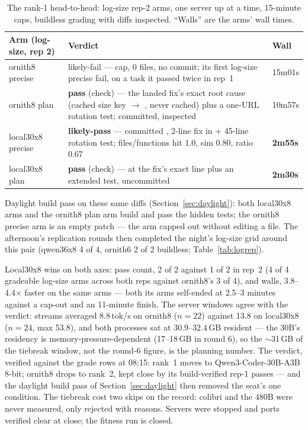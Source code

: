 \begin{table}[htbp]
\centering
\small
\caption{The rank-1 head-to-head: log-size rep-2 arms, one server up at a time, 15-minute caps, buildless
grading with diffs inspected. ``Walls'' are the arms' wall times.}\label{tab:h2h}
\begin{tabular}{P{3.4cm}P{8.6cm}P{2.4cm}}
\toprule
Arm (log-size, rep 2) & Verdict & Wall \\
\midrule
ornith8 precise & likely-fail --- cap, 0 files, no commit; its first log-size precise fail, on a task it passed twice in rep~1 & 15m01s \\
ornith8 plan & \textbf{pass} (check) --- the landed fix's exact root cause (cached size key $\rightarrow$ , never cached) plus a one-URL rotation test; committed, inspected & 10m57s \\
local30x8 precise & \textbf{likely-pass} --- committed , 2-line fix in  + 45-line rotation test; files/functions hit 1.0, sim 0.80, ratio 0.67 & \textbf{2m55s} \\
local30x8 plan & \textbf{pass} (check) ---  at the fix's exact line plus an extended test, uncommitted & \textbf{2m30s} \\
\bottomrule
\end{tabular}

\smallskip\footnotesize
Daylight build pass on these same diffs (Section~\ref{sec:daylight}): both local30x8 arms and the ornith8 plan
arm build and pass the hidden tests; the ornith8 precise arm is an empty patch --- the arm capped out without
editing a file. The afternoon's replication rounds then completed the night's log-size grid around this pair
(qwen36x8 4 of 4, ornith6 2 of 2 buildless; Table~\ref{tab:logrep}).
\end{table}

Local30x8 wins on both axes: pass count, 2 of 2 against 1 of 2 in rep~2 (4 of 4 gradeable log-size arms across
both reps against ornith8's 3 of 4), and walls, 3.8--4.4$\times$ faster on the same arms --- both its arms
self-ended at 2.5--3 minutes against a cap-out and an 11-minute finish. The server windows agree with the
verdict: streams averaged 8.8\,tok/s on ornith8 ($n{=}22$) against 13.8 on local30x8 ($n{=}24$, max 53.8), and
both processes sat at 30.9--32.4\,GB resident --- the 30B's residency is memory-pressure-dependent (17--18\,GB
in round 6), so the ${\sim}$31\,GB of the tiebreak window, not the round-6 figure, is the planning number. The
verdict, verified against the grade rows at 08:15: rank~1 moves to Qwen3-Coder-30B-A3B 8-bit; ornith8 drops to
rank~2, kept close by its build-verified rep-1 passes --- and the daylight build pass of
Section~\ref{sec:daylight} then removed the seat's one condition. The tiebreak cost two skips on the record:
colibri and the 480B were never
measured, only rejected with reasons. Servers were stopped and ports verified clear at close; the fitness run
is closed.

